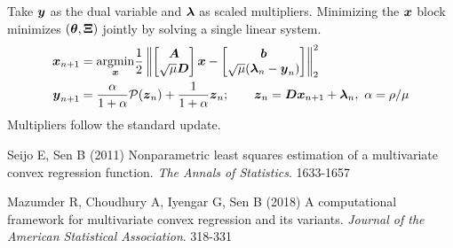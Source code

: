 \documentclass{article}
\begin{document}
Take $\boldsymbol{y}$ as the dual variable and $\boldsymbol{\lambda}$ as scaled multipliers.
Minimizing the $\boldsymbol{x}$ block minimizes $(\boldsymbol{\theta},\boldsymbol{\Xi})$ jointly by solving a single linear system.
\begin{align*}
    \boldsymbol{x}_{n+1}
    &=
    \underset{\boldsymbol{x}}{\mathop{\rm argmin}\nolimits} \frac{1}{2} \left\|
        \begin{bmatrix}
        \boldsymbol{A} \\
        \sqrt{\mu} \boldsymbol{D}
        \end{bmatrix} \boldsymbol{x}
        -
        \begin{bmatrix}
        \boldsymbol{b} \\
        \sqrt{\mu} (\boldsymbol{\lambda}_{n} - \boldsymbol{y}_{n})
        \end{bmatrix}
    \right\|_{2}^{2} \\
    \boldsymbol{y}_{n+1}
    &= \frac{\alpha}{1+\alpha} \mathcal{P}(\boldsymbol{z}_{n}) + \frac{1}{1+\alpha} \boldsymbol{z}_{n};
    \qquad \boldsymbol{z}_{n} = \boldsymbol{D} \boldsymbol{x}_{n+1} + \boldsymbol{\lambda}_{n},~\alpha = \rho / \mu
    \end{align*}
Multipliers follow the standard update.

\begin{thebibliography}{99}
    Seijo E, Sen B (2011) {Nonparametric least squares estimation of a multivariate convex regression function}. {\it The Annals of Statistics}. 1633-1657

    Mazumder R, Choudhury A, Iyengar G, Sen B (2018) {A computational framework for multivariate convex regression and its variants}. {\it Journal of the American Statistical Association}. 318-331
\end{thebibliography}
\end{document}
